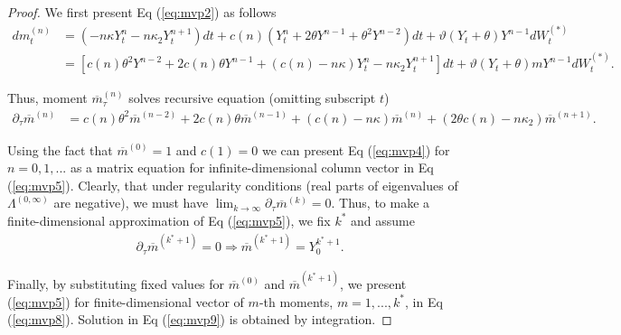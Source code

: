 \documentclass[pdftex,11pt,a4paper] {article}
\begin{document}
\begin{proof}
We first present Eq (\ref{eq:mvp2}) as follows
\begin{equation*}
\begin{split}
dm^{(n)}_{t}& =  \left(- n\kappa Y^{n}_{t}   - n\kappa_{2}Y^{n+1}_{t}\right)dt +c(n) \left(Y^{n}_{t}+2\theta Y^{n-1}+\theta^{2}Y^{n-2}\right)dt  + \vartheta \left(Y_{t}+\theta\right)Y^{n-1} dW^{(*)}_{t}\\
& =  \left[c(n)\theta^{2}Y^{n-2}+ 2c(n)\theta Y^{n-1} + (c(n)- n\kappa) Y^{n}_{t}  - n\kappa_{2}Y^{n+1}_{t}\right]dt   + \vartheta \left(Y_{t}+\theta\right)mY^{n-1} dW^{(*)}_{t}.
\end{split}
\end{equation*}


Thus, moment $\overline{m}^{(n)}_{\tau}$ solves recursive equation (omitting subscript $t$)
\begin{equation} \label {eq:mvp4}
\begin{split}
\partial_{\tau}\overline{m}^{(n)}& =  c(n)\theta^{2}\overline{m}^{(n-2)}+ 2c(n)\theta \overline{m}^{(n-1)}+  (c(n)- n\kappa )\overline{m}^{(n)}  + (2\theta c(n)- n\kappa_{2})\overline{m}^{(n+1)}.
\end{split}
\end{equation}

Using the fact that $\overline{m}^{(0)}=1$ and $c(1)=0$ we can present Eq (\ref{eq:mvp4}) for $n=0,1,...$ as a matrix equation for infinite-dimensional column vector in Eq (\ref{eq:mvp5}). Clearly, that under regularity conditions (real parts of eigenvalues of $\Lambda^{(0,\infty)}$ are negative), we must have $\lim_{k\rightarrow \infty} \partial_{\tau}\overline{m}^{(k)} = 0$. Thus, to make a finite-dimensional approximation of Eq (\ref{eq:mvp5}), we fix $k^{*}$ and assume
\begin{equation} \label {eq:mvp7}
\begin{split}
& \partial_{\tau}\overline{m}^{(k^{*}+1)}=0  \Rightarrow \overline{m}^{(k^{*}+1)} = Y^{k^{*}+1}_{0}.
\end{split}
\end{equation}

Finally, by substituting fixed values for $\overline{m}^{(0)}$ and $\overline{m}^{(k^{*}+1)}$, we present (\ref{eq:mvp5}) for finite-dimensional vector of $m$-th moments, $m=1,...,k^{*}$, in Eq (\ref{eq:mvp8}). Solution in Eq (\ref{eq:mvp9}) is obtained by integration.
\end{proof}
\end{document}
